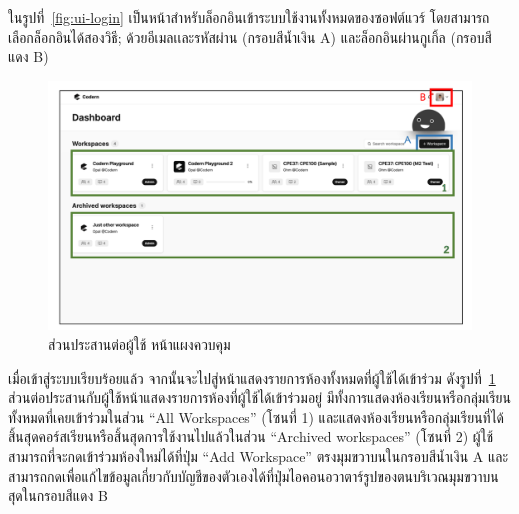 \documentclass[12pt,one side,openright,a4paper]{cpe-thesis-th}
\newcommand{\thaijustify}[1]{%
  \par\hspace{30pt}\justifying
  #1
}
\begin{document}
    \thaijustify{
        ในรูปที่~\ref{fig:ui-login} เป็นหน้าสำหรับล็อกอินเข้าระบบใช้งานทั้งหมดของซอฟต์แวร์ โดยสามารถเลือกล็อกอินได้สองวิธี; ด้วยอีเมลเเละรหัสผ่าน (กรอบสีน้ำเงิน A) และล็อกอินผ่านกูเกิ้ล (กรอบสีแดง B) 
    }  

    \hypertarget{ui-dashboard1}{
        \begin{figure}[H]
        \centering
            \includegraphics[width=15cm]{figure/ui/ui-dashboard1.png}
            \caption[ส่วนประสานต่อผู้ใช้ หน้าแผงควบคุม]{ส่วนประสานต่อผู้ใช้ หน้าแผงควบคุม}
            \label{fig:ui-dashboard1}
        \end{figure}
    }
    
    \thaijustify{
        เมื่อเข้าสู่ระบบเรียบร้อยแล้ว จากนั้นจะไปสู่หน้าแสดงรายการห้องทั้งหมดที่ผู้ใช้ได้เข้าร่วม ดังรูปที่~\ref{fig:ui-dashboard1} ส่วนต่อประสานกับผู้ใช้หน้าแสดงรายการห้องที่ผู้ใช้ได้เข้าร่วมอยู่ มีทั้งการแสดงห้องเรียนหรือกลุ่มเรียนทั้งหมดที่เคยเข้าร่วมในส่วน “All Workspaces” (โซนที่ 1) และแสดงห้องเรียนหรือกลุ่มเรียนที่ได้สิ้นสุดคอร์สเรียนหรือสิ้นสุดการใช้งานไปแล้วในส่วน “Archived workspaces” (โซนที่ 2) ผู้ใช้สามารถที่จะกดเข้าร่วมห้องใหม่ได้ที่ปุ่ม “Add Workspace” ตรงมุมขวาบนในกรอบสีน้ำเงิน A และสามารถกดเพื่อแก้ไขข้อมูลเกี่ยวกับบัญชีของตัวเองได้ที่ปุ่มไอคอนอวาตาร์รูปของตนบริเวณมุมขวาบนสุดในกรอบสีแดง B

    }
    
\end{document}
